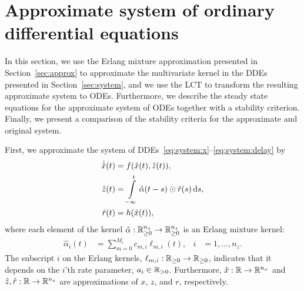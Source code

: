 \section{Approximate system of ordinary differential equations}\label{sec:lct}
In this section, we use the Erlang mixture approximation presented in Section~\ref{sec:approx} to approximate the multivariate kernel in the DDEs presented in Section~\ref{sec:system}, and we use the LCT to transform the resulting approximate system to ODEs. Furthermore, we describe the steady state equations for the approximate system of ODEs together with a stability criterion. Finally, we present a comparison of the stability criteria for the approximate and original system.

First, we approximate the system of DDEs~\eqref{eq:system:x}--\eqref{eq:system:delay} by
%
\begin{subequations}\label{eq:lct:approximate:system:DDE}
	\begin{align}
		\dot{\hat x}(t) &= f(\hat x(t), \hat z(t)), \\
		\hat z(t) &= \int\limits_{-\infty}^t \hat \alpha(t - s) \odot \hat r(s) \,\mathrm{d} s, \\
		\hat r(t) &= h(\hat x(t)),
	\end{align}
\end{subequations}
%
where each element of the kernel $\hat \alpha: \mathbb{R}_{\geq 0}^{n_z} \rightarrow \mathbb{R}_{\geq 0}^{n_z}$ is an Erlang mixture kernel:
%
\begin{align}\label{eq:lct:approximate:kernel:DDE}
	\hat \alpha_i(t) &= \sum_{m=0}^{M_i} c_{m, i} \ell_{m, i}(t), & i &= 1, \ldots, n_z.
\end{align}
%
The subscript $i$ on the Erlang kernels, $\ell_{m, i}: \mathbb{R}_{\geq 0} \rightarrow \mathbb{R}_{\geq 0}$, indicates that it depends on the $i$'th rate parameter, $a_i \in \mathbb{R}_{> 0}$. Furthermore, $\hat x: \mathbb{R} \rightarrow \mathbb{R}^{n_x}$ and $\hat z, \hat r: \mathbb{R} \rightarrow \mathbb{R}^{n_z}$ are approximations of $x$, $z$, and $r$, respectively.%

